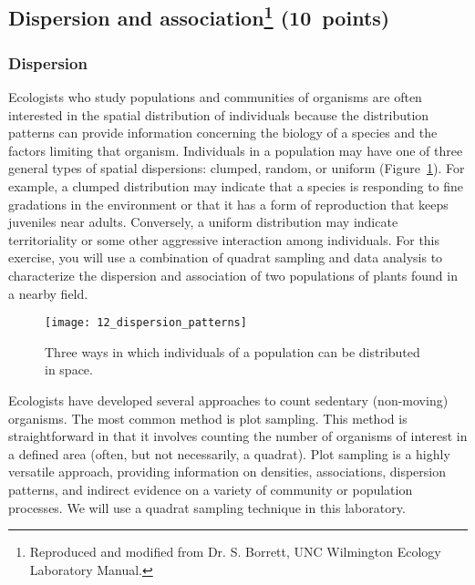 \documentclass[12pt, hidelinks]{exam}
\newcommand{\hidepoints}{%
	\pointsinmargin\pointformat{}
}
\begin{document}
\hidepoints

\subsection*{Dispersion and association\footnote{Reproduced and modified from Dr. S. Borrett, UNC Wilmington Ecology Laboratory Manual.} (10~points)}

\subsubsection*{Dispersion}

Ecologists who study populations and communities of
organisms are often interested in the spatial distribution of
individuals because the distribution patterns can provide information
concerning the biology of a species and the factors limiting that
organism. Individuals in a population may have one of three general
types of spatial dispersions: clumped, random, or uniform (Figure~\ref{fig:dispersion_patterns}).
For example, a clumped distribution may indicate that a species is
responding to fine gradations in the environment or that it has a form
of reproduction that keeps juveniles near adults. Conversely, a uniform
distribution may indicate territoriality or some other aggressive
interaction among individuals. For this exercise, you will use a
combination of quadrat sampling and data analysis to characterize the
dispersion and association of two populations of plants found in a nearby field.

\begin{figure}[h!]
	\begin{center}
	\texttt{[image: 12\_dispersion\_patterns]}
	\caption{Three ways in which individuals of a population can be
distributed in space.}\label{fig:dispersion_patterns}
	\end{center}
\end{figure}

Ecologists have developed several approaches to count sedentary (non-moving)
 organisms. The most common method is plot sampling. This
method is straightforward in that it involves counting the number of
organisms of interest in a defined area (often, but not necessarily, a
quadrat). Plot sampling is a highly versatile approach, providing
information on densities, associations, dispersion patterns, and
indirect evidence on a variety of community or population processes. We
will use a quadrat sampling technique in this laboratory.
\end{document}
